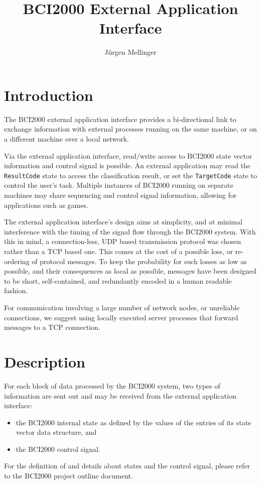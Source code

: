 \documentclass[12pt,a4paper,notitlepage]{article}
\title{BCI2000 External Application Interface}
\author{J\"{u}rgen Mellinger}
\begin{document}
\maketitle
\tableofcontents

\pagebreak
\section{Introduction}

The BCI2000 external application interface provides a bi-directional link to exchange 
information with external processes running on the same machine, or on a different machine
over a local network.

Via the external application interface, read/write access to BCI2000 state vector information 
and control signal is possible. An external application may read the \texttt{ResultCode} state
to access the classification result, or set the \texttt{TargetCode} state to control the user's task.
Multiple instances of BCI2000 running on separate machines may share sequencing and control signal 
information, allowing for applications such as games.

The external application interface's design aims at simplicity, and at minimal interference with 
the timing of the signal flow through the BCI2000 system.
With this in mind, a connection-less, UDP based transmission protocol was chosen rather than a TCP based one.
This comes at the cost of a possible loss, or re-ordering of protocol messages.
To keep the probability for such losses as low as possible, and their consequences as
local as possible, messages have been designed to be short, self-contained, and redundantly
encoded in a human readable fashion.

For communication involving a large number of network nodes, or unreliable connections, we suggest 
using locally executed server processes that forward messages to a TCP connection.

\section{Description}

For each block of data processed by the BCI2000 system, two types of information are sent out
and may be received from the external application interface:
\begin{itemize}
\item the BCI2000 internal state as defined by the values of the entries of its state vector data structure, and
\item the BCI2000 control signal.
\end{itemize}
For the definition of and details about states and the control signal, please refer to the BCI2000
project outline document.
\end{document}
